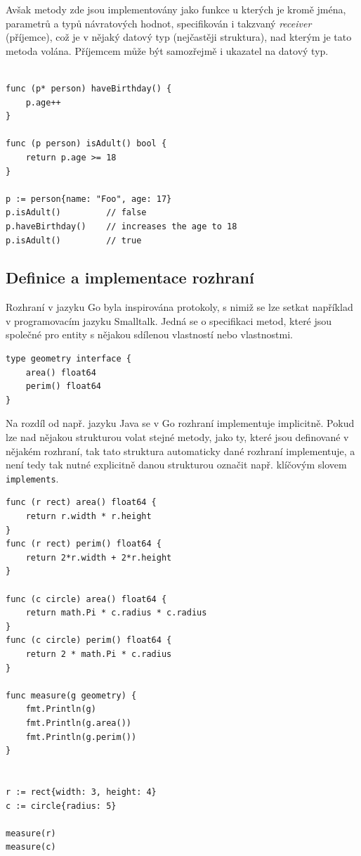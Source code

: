 \documentclass[12pt, a4paper]{article}
\begin{document}
Avšak metody zde jsou implementovány jako funkce u kterých je kromě jména, parametrů a typů návratových hodnot, specifikován i takzvaný \textit{receiver} (příjemce), což je v nějaký datový typ (nejčastěji struktura), nad kterým je tato metoda volána. Příjemcem může být samozřejmě i ukazatel na datový typ.

\begin{lstlisting}[caption={Volání metod nad strukturami}, captionpos=b]

func (p* person) haveBirthday() {
    p.age++
}

func (p person) isAdult() bool {
    return p.age >= 18
}

p := person{name: "Foo", age: 17}
p.isAdult()         // false
p.haveBirthday()    // increases the age to 18
p.isAdult()         // true
\end{lstlisting}

\subsection{Definice a implementace rozhraní}
Rozhraní v jazyku Go byla inspirována protokoly, s nimiž se lze setkat například v programovacím jazyku Smalltalk. Jedná se o specifikaci metod, které jsou společné pro entity s nějakou sdílenou vlastností nebo vlastnostmi.

\begin{lstlisting}[caption={Definice rozhraní}, captionpos=b]
type geometry interface {
    area() float64
    perim() float64
}
\end{lstlisting}

Na rozdíl od např. jazyku Java se v Go rozhraní implementuje implicitně. Pokud lze nad nějakou strukturou volat stejné metody, jako ty, které jsou definované v nějakém rozhraní, tak tato struktura automaticky dané rozhraní implementuje, a není tedy tak nutné explicitně danou strukturou označit např. klíčovým slovem \texttt{implements}.


\begin{lstlisting}[caption={Implementace \texttt{geometry}}, captionpos=b]
func (r rect) area() float64 {
    return r.width * r.height
}
func (r rect) perim() float64 {
    return 2*r.width + 2*r.height
}

func (c circle) area() float64 {
    return math.Pi * c.radius * c.radius
}
func (c circle) perim() float64 {
    return 2 * math.Pi * c.radius
}

func measure(g geometry) {
    fmt.Println(g)
    fmt.Println(g.area())
    fmt.Println(g.perim())
}


r := rect{width: 3, height: 4}
c := circle{radius: 5}

measure(r)
measure(c)

\end{lstlisting}
\end{document}

